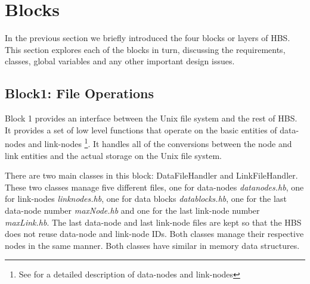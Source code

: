 
\section{Blocks}
\label{sec:blocks}

In the previous section we briefly introduced the four blocks or layers of
HBS.  This section explores each of the blocks in turn, discussing the
requirements, classes, global variables and any other important design issues.

\subsection{Block1: File Operations}

Block 1 provides an interface between the Unix file system and the
rest of HBS.  It provides a set of low level functions that operate on
the basic entities of data-nodes and link-nodes \footnote{See \cite{Wiil90a} for a
detailed description of data-nodes and link-nodes}.  It handles all of the conversions
between the node and link entities and the actual storage on the Unix file
system.  

%

There are two main classes in this block: DataFileHandler and
LinkFileHandler.  These two classes manage five different files, one for
data-nodes {\em datanodes.hb}, one for link-nodes {\em linknodes.hb}, one
for data blocks {\em datablocks.hb}, one for the last
data-node number {\em maxNode.hb} and one for the last link-node number
{\em maxLink.hb}.  The last data-node
and last link-node files are kept so that the HBS does not reuse data-node
and link-node IDs.  Both classes manage their respective nodes in the same
manner. Both classes have similar in memory data structures.

